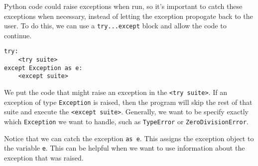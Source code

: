 Python code could raise exceptions when run, so it's important to catch these exceptions when necessary, instead of letting the exception propogate back to the user. To do this, we can use a \texttt{try...except} block and allow the code to continue.

\begin{lstlisting}
try:
    <try suite>
except Exception as e:
    <except suite>
\end{lstlisting}

We put the code that might raise an exception in the \texttt{<try suite>}. If an exception of type \texttt{Exception} is raised, then the program will skip the rest of that suite and execute the \texttt{<except suite>}. Generally, we want to be specify exactly which \texttt{Exception} we want to handle, such as \texttt{TypeError} or \texttt{ZeroDivisionError}.

Notice that we can catch the exception \texttt{as e}. This assigns the exception object to the variable \texttt{e}. This can be helpful when we want to use information about the exception that was raised.

